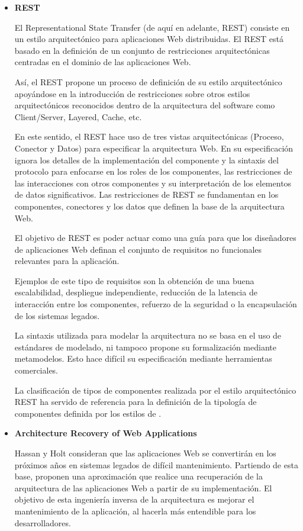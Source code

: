\begin{itemize}

\item  \textbf{REST}

El Representational State Transfer (de aquí en adelante, REST) \cite{31} consiste en un
estilo arquitectónico para aplicaciones Web distribuidas. El REST está basado en la definición de un conjunto de restricciones arquitectónicas centradas en el dominio de las aplicaciones Web.

Así, el REST propone un proceso de definición de su estilo arquitectónico apoyándose en la introducción de restricciones sobre otros estilos arquitectónicos reconocidos dentro de la arquitectura del software como Client/Server, Layered, Cache, etc.

En este sentido, el REST hace uso de tres vistas arquitectónicas (Proceso, Conector y Datos) para especificar la arquitectura Web. En su especificación ignora los detalles de la implementación del componente y la sintaxis del protocolo para enfocarse en los roles de los componentes, las restricciones de las interacciones con otros componentes y su interpretación de los elementos de datos significativos. Las restricciones de REST se fundamentan en los componentes, conectores y los datos que definen la base de la arquitectura Web.

El objetivo de REST es poder actuar como una guía para que los diseñadores de aplicaciones Web definan el conjunto de requisitos no funcionales relevantes para la aplicación.

Ejemplos de este tipo de requisitos son la obtención de una buena escalabilidad, despliegue independiente, reducción de la latencia de interacción entre los componentes, refuerzo de la seguridad o la encapsulación de los sistemas legados.

La sintaxis utilizada para modelar la arquitectura no se basa en el uso de
estándares de modelado, ni tampoco propone su formalización mediante metamodelos. Esto hace difícil su especificación mediante herramientas comerciales.

La clasificación de tipos de componentes realizada por el estilo arquitectónico
REST ha servido de referencia para la definición de la tipología de componentes
definida por los estilos de .


\item \textbf{Architecture Recovery of Web Applications}

Hassan y Holt \cite{42} consideran que las aplicaciones Web se convertirán en los
próximos años en sistemas legados de difícil mantenimiento. Partiendo de esta
base, proponen una aproximación que realice una recuperación de la arquitectura
de las aplicaciones Web a partir de su implementación. El objetivo de esta
ingeniería inversa de la arquitectura es mejorar el mantenimiento de la
aplicación, al hacerla más entendible para los desarrolladores.


\end{itemize}
